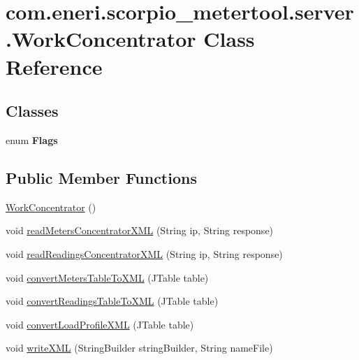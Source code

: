 \hypertarget{classcom_1_1eneri_1_1scorpio__metertool_1_1server_1_1_work_concentrator}{}\section{com.\+eneri.\+scorpio\+\_\+metertool.\+server.\+Work\+Concentrator Class Reference}
\label{classcom_1_1eneri_1_1scorpio__metertool_1_1server_1_1_work_concentrator}
\subsection*{Classes}
\begin{DoxyCompactItemize}
\item 
enum {\bfseries Flags}
\end{DoxyCompactItemize}
\subsection*{Public Member Functions}
\begin{DoxyCompactItemize}
\item 
\hyperlink{classcom_1_1eneri_1_1scorpio__metertool_1_1server_1_1_work_concentrator_a612a341f7aa7dd78fd18276bb299536f}{Work\+Concentrator} ()
\item 
void \hyperlink{classcom_1_1eneri_1_1scorpio__metertool_1_1server_1_1_work_concentrator_aa8e9baf9f490f06a5bfcc261e0423c5f}{read\+Meters\+Concentrator\+X\+ML} (String ip, String response)
\item 
void \hyperlink{classcom_1_1eneri_1_1scorpio__metertool_1_1server_1_1_work_concentrator_aec8310175d26cc35023d4b5b5cd295ce}{read\+Readings\+Concentrator\+X\+ML} (String ip, String response)
\item 
void \hyperlink{classcom_1_1eneri_1_1scorpio__metertool_1_1server_1_1_work_concentrator_a065f35c037c48b1cb9e5b115663b2b89}{convert\+Meters\+Table\+To\+X\+ML} (J\+Table table)
\item 
void \hyperlink{classcom_1_1eneri_1_1scorpio__metertool_1_1server_1_1_work_concentrator_a7fdc5a15b5e4bdfe640a2f27227dff4c}{convert\+Readings\+Table\+To\+X\+ML} (J\+Table table)
\item 
void \hyperlink{classcom_1_1eneri_1_1scorpio__metertool_1_1server_1_1_work_concentrator_a52e568e16c48b0faa4dded8a5e557126}{convert\+Load\+Profile\+X\+ML} (J\+Table table)
\item 
void \hyperlink{classcom_1_1eneri_1_1scorpio__metertool_1_1server_1_1_work_concentrator_aca5015705192a8018c29669a19bcdcef}{write\+X\+ML} (String\+Builder string\+Builder, String name\+File)
\end{DoxyCompactItemize}


